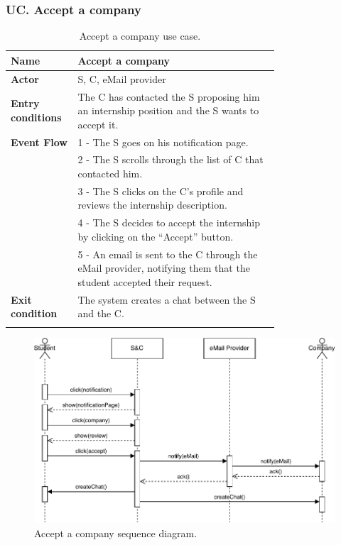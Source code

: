\subsubsection*{UC\cuc . Accept a company}
\begin{center}
    \begin{longtable}{|l|p{0.75\linewidth}|}
        \hline
        \textbf{Name}               & Accept a company\\
        \hline
        \textbf{Actor}              & S, C, eMail provider\\
        \hline
        \textbf{Entry conditions}   & The C has contacted the S proposing him an internship position and the S wants to accept it.\\
        \hline
        \textbf{Event Flow}         & 1 - The S goes on his notification page. \\
        & 2 - The S scrolls through the list of C that contacted him. \\
        & 3 - The S clicks on the C’s profile and reviews the internship description. \\
        & 4 - The S decides to accept the internship by clicking on the “Accept” button. \\
        & 5 - An email is sent to the C through the eMail provider, notifying them that the student accepted their request. \\
        \hline
        \textbf{Exit condition}   & The system creates a chat between the S and the C. \\       
        \hline
        \caption{Accept a company use case.}
        \label{tab: accept_company_use_case}
    \end{longtable}
\end{center}


\begin{figure}[H]
    \begin{center}
        \includegraphics[width=\linewidth]{Images/SequenceDiagram/AcceptCompanySD.pdf}
        \caption{Accept a company sequence diagram.}
        \label{fig:accept_company_seqdiag}%
    \end{center}
\end{figure}


